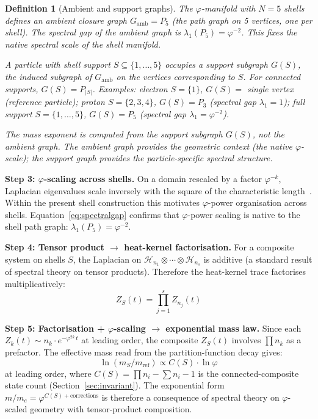\documentclass[12pt]{article}
\newtheorem{definition}[theorem]{Definition}
\newcommand{\phig}{\varphi}
\begin{document}
\begin{definition}[Ambient and support graphs]\label{def:ambient}
The $\phig$-manifold with $N = 5$ shells defines an \textit{ambient closure graph} $G_{\mathrm{amb}} = P_5$ (the path graph on 5 vertices, one per shell). The spectral gap of the ambient graph is $\lambda_1(P_5) = \phig^{-2}$. This fixes the native spectral scale of the shell manifold.

A particle with shell support $S \subseteq \{1, \ldots, 5\}$ occupies a \textit{support subgraph} $G(S)$, the induced subgraph of $G_{\mathrm{amb}}$ on the vertices corresponding to $S$. For connected supports, $G(S) = P_{|S|}$. Examples: electron $S = \{1\}$, $G(S) =$ single vertex (reference particle); proton $S = \{2,3,4\}$, $G(S) = P_3$ (spectral gap $\lambda_1 = 1$); full support $S = \{1,\ldots,5\}$, $G(S) = P_5$ (spectral gap $\lambda_1 = \phig^{-2}$).

The mass exponent is computed from the support subgraph $G(S)$, not the ambient graph. The ambient graph provides the geometric context (the native $\phig$-scale); the support graph provides the particle-specific spectral structure.
\end{definition}

\textbf{Step 3: $\phig$-scaling across shells.} On a domain rescaled by a factor $\phig^{-k}$, Laplacian eigenvalues scale inversely with the square of the characteristic length~\citep{Weyl1912}. Within the present shell construction this motivates $\phig$-power organisation across shells. Equation~\eqref{eq:spectralgap} confirms that $\phig$-power scaling is native to the shell path graph: $\lambda_1(P_5) = \phig^{-2}$.

\textbf{Step 4: Tensor product $\to$ heat-kernel factorisation.} For a composite system on shells $S$, the Laplacian on $\mathcal{H}_{n_1} \otimes \cdots \otimes \mathcal{H}_{n_s}$ is additive (a standard result of spectral theory on tensor products). Therefore the heat-kernel trace factorises multiplicatively:
\begin{equation}
    Z_S(t) = \prod_{j=1}^{s} Z_{n_j}(t)
\end{equation}

\textbf{Step 5: Factorisation + $\phig$-scaling $\to$ exponential mass law.} Since each $Z_k(t) \sim n_k \cdot e^{-\phig^{2k}\, t}$ at leading order, the composite $Z_S(t)$ involves $\prod n_k$ as a prefactor. The effective mass read from the partition-function decay gives:
\begin{equation}
    \ln(m_S / m_{\mathrm{ref}}) \propto C(S) \cdot \ln \phig
\end{equation}
at leading order, where $C(S) = \prod n_i - \sum n_i - 1$ is the connected-composite state count (Section~\ref{sec:invariant}). The exponential form $m/m_e = \phig^{C(S) + \text{corrections}}$ is therefore a consequence of spectral theory on $\phig$-scaled geometry with tensor-product composition.
\end{document}
